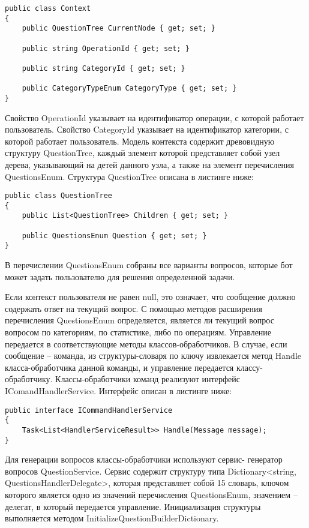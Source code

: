 \lstset{style=sharpc}
\begin{lstlisting}
public class Context
{
	public QuestionTree CurrentNode { get; set; }

	public string OperationId { get; set; }

	public string CategoryId { get; set; }

	public CategoryTypeEnum CategoryType { get; set; }
}
\end{lstlisting}

Свойство OperationId указывает на идентификатор операции, с которой работает пользователь.
Свойство CategoryId указывает на идентификатор категории, с которой работает пользователь.
Модель контекста содержит древовидную структуру QuestionTree, каждый элемент которой представляет собой узел дерева, указывающий на детей данного узла, а также на элемент перечисления QuestionsEnum. Структура QuestionTree описана в листинге ниже:

\lstset{style=sharpc}
\begin{lstlisting}
public class QuestionTree
{
	public List<QuestionTree> Children { get; set; }

	public QuestionsEnum Question { get; set; }
}
\end{lstlisting}

В перечислении QuestionsEnum собраны все варианты вопросов, которые бот может задать пользователю для решения определенной задачи.

Если контекст пользователя не равен null, это означает, что сообщение должно содержать ответ на текущий вопрос. С помощью методов расширения перечисления QuestionsEnum определяется, является ли текущий вопрос вопросом по категориям, по статистике, либо по операциям. Управление передается в соответствующие методы классов-обработчиков.
В случае, если сообщение – команда, из структуры-словаря по ключу извлекается метод Handle класса-обработчика данной команды, и управление передается классу-обработчику.
Классы-обработчики команд реализуют интерфейс IComandHandlerService. Интерфейс описан в листинге ниже:

\lstset{style=sharpc}
\begin{lstlisting}
public interface ICommandHandlerService
{
	Task<List<HandlerServiceResult>> Handle(Message message);
}
\end{lstlisting}

Для генерации вопросов классы-обработчики используют сервис- \linebreak генератор вопросов QuestionService. Сервис содержит структуру типа \linebreak Dictionary<string, QuestionsHandlerDelegate>, которая представляет собой
15
словарь, ключом которого является одно из значений перечисления \linebreak QuestionsEnum, значением – делегат, в который передается управление.
Инициализация структуры выполняется методом \linebreak InitializeQuestionBuilderDictionary.

